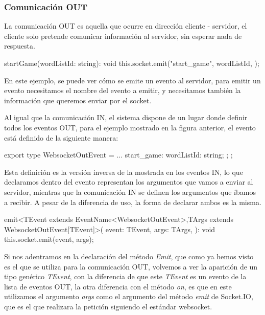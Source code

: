\subsubsection{Comunicación OUT}
La comunicación OUT es aquella que ocurre en dirección cliente - servidor, el cliente solo pretende comunicar información al servidor, sin esperar nada de respuesta.

\begin{mytypescript}[float={!h},caption={Ejemplo de uso del método \textit{emit}.},label={alg:emit_usage}]
	startGame(wordListId: string): void {
		this.socket.emit("start_game", {
			wordListId,
		});
	}
\end{mytypescript}

En este ejemplo, se puede ver cómo se emite un evento al servidor, para emitir un evento necesitamos el nombre del evento a emitir, y necesitamos también la información que queremos enviar por el socket.

Al igual que la comunicación IN, el sistema dispone de un lugar donde definir todos los eventos OUT, para el ejemplo mostrado en la figura anterior, el evento está definido de la siguiente manera:

\begin{mytypescript}[float={!h},caption={Ejemplo de declaración de la comunicación OUT.},label={alg:start_game_type}]
	export type WebsocketOutEvent = {
		...
		start_game: {
			wordListId: string;
		};
	};
\end{mytypescript}

Esta definición es la versión inversa de la mostrada en los eventos IN, lo que declaramos dentro del evento representan los argumentos que vamos a enviar al servidor, mientras que la comunicación IN se definen los argumentos que íbamos a recibir. A pesar de la diferencia de uso, la forma de declarar ambos es la misma.

\begin{mytypescript}[float={!h},caption={Declaración del método \textit{emit}.},label={alg:emit_method}]
	emit<TEvent extends EventName<WebsocketOutEvent>,TArgs extends WebsocketOutEvent[TEvent]>(
	event: TEvent,
	args: TArgs,
	): void {
		this.socket.emit(event, args);
	}
\end{mytypescript}

Si nos adentramos en la declaración del método \textit{Emit}, que como ya hemos visto es el que se utiliza para la comunicación OUT, volvemos a ver la aparición de un tipo genérico \textit{TEvent}, con la diferencia de que este \textit{TEvent} es un evento de la lista de eventos OUT, la otra diferencia con el método \textit{on}, es que en este utilizamos el argumento \textit{args} como el argumento del método \textit{emit} de Socket.IO, que es el que realizara la petición siguiendo el estándar websocket.

